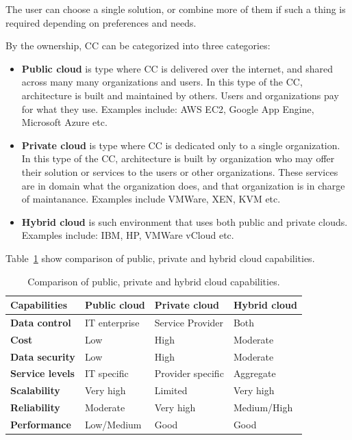 The user can choose a single solution, or combine more of them if such a thing is required depending on preferences and needs.

By the ownership, CC can be categorized into three categories:

\begin{itemize}
	\item \textbf{Public cloud} is type where CC is delivered over the internet, and shared across many many organizations and users. In this type of the CC, architecture is built and maintained by others. Users and organizations pay for what they use. Examples include: AWS EC2, Google App Engine, Microsoft Azure etc.
	\item \textbf{Private cloud} is type where CC is dedicated only to a single organization. In this type of the CC, architecture is built by organization who may offer their solution or services to the users or other organizations. These services are in domain what the organization does, and that organization is in charge of maintanance. Examples include VMWare, XEN, KVM etc.
	\item \textbf{Hybrid cloud} is such environment that uses both public and private clouds. Examples include: IBM, HP, VMWare vCloud etc.
\end{itemize}

Table~\ref{tab:table4} show comparison of public, private and hybrid cloud capabilities.\label{sec_types}

\begin{table}[h!]
	\begin{center}
		\begin{tabular}{l|l|l|l}
			\textbf{Capabilities} & \textbf{Public cloud} & \textbf{Private cloud} & \textbf{Hybrid cloud}\\
			\hline
			\textbf{Data control} & IT enterprise & Service Provider & Both \\
			\textbf{Cost} & Low & High & Moderate \\
			\textbf{Data security} & Low & High & Moderate \\
			\textbf{Service levels} & IT specific & Provider specific & Aggregate \\
			\textbf{Scalability} & Very high & Limited & Very high \\	
			\textbf{Reliability} & Moderate & Very high & Medium/High\\	
			\textbf{Performance} & Low/Medium & Good & Good \\
\end{tabular}
	\end{center}
	\vspace{-0.5cm}
	\caption{Comparison of public, private and hybrid cloud capabilities.}
	\label{tab:table4}
\end{table}

